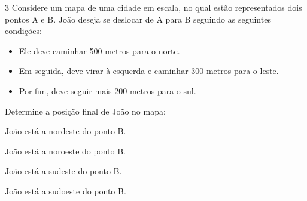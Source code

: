 
\num{3} Considere um mapa de uma cidade em escala, no qual estão
representados dois pontos A e B. João deseja se deslocar de A para B
seguindo as seguintes condições:

\begin{itemize}
\item Ele deve caminhar 500 metros para o norte. 
\item Em seguida, deve virar à esquerda e caminhar 300 metros para o leste. 
\item Por fim, deve seguir mais 200 metros para o sul.
\end{itemize}

Determine a posição final de João no mapa:

\begin{escolha}
\item João está a nordeste do ponto B.
\item João está a noroeste do ponto B.
\item João está a sudeste do ponto B.
\item João está a sudoeste do ponto B.
\end{escolha}


